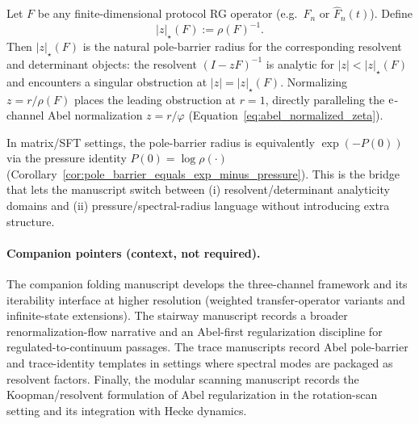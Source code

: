 \begin{proposition}\label{prop:rg_pole_barrier_radius}
\MathTag Let $F$ be any finite-dimensional protocol RG operator (e.g.\ $F_n$ or $\widehat F_n(t)$).
Define
\[
|z|_\star(F):=\rho(F)^{-1}.
\]
Then $|z|_\star(F)$ is the natural pole-barrier radius for the corresponding resolvent and determinant objects:
the resolvent $(I-zF)^{-1}$ is analytic for $|z|<|z|_\star(F)$ and encounters a singular obstruction at $|z|=|z|_\star(F)$.
Normalizing $z=r/\rho(F)$ places the leading obstruction at $r=1$, directly paralleling the $\mathrm{e}$-channel Abel normalization $z=r/\varphi$ (Equation~\eqref{eq:abel_normalized_zeta}).
\end{proposition}

\begin{remark}\label{rem:rg_pole_barrier_pressure_reading}
\AuditTag In matrix/SFT settings, the pole-barrier radius is equivalently $\exp(-P(0))$ via the pressure identity $P(0)=\log\rho(\cdot)$ (Corollary~\ref{cor:pole_barrier_equals_exp_minus_pressure}).
This is the bridge that lets the manuscript switch between (i) resolvent/determinant analyticity domains and (ii) pressure/spectral-radius language without introducing extra structure.
\end{remark}

\paragraph{Companion pointers (context, not required).}
The companion folding manuscript \cite{Ma2025RF} develops the three-channel framework and its iterability interface at higher resolution (weighted transfer-operator variants and infinite-state extensions).
The stairway manuscript \cite{Ma2025STI} records a broader renormalization-flow narrative and an Abel-first regularization discipline for regulated-to-continuum passages.
The trace manuscripts \cite{Ma2025HHU,Ma2025RGS} record Abel pole-barrier and trace-identity templates in settings where spectral modes are packaged as resolvent factors.
Finally, the modular scanning manuscript \cite{Ma2025RHSP} records the Koopman/resolvent formulation of Abel regularization in the rotation-scan setting and its integration with Hecke dynamics.
